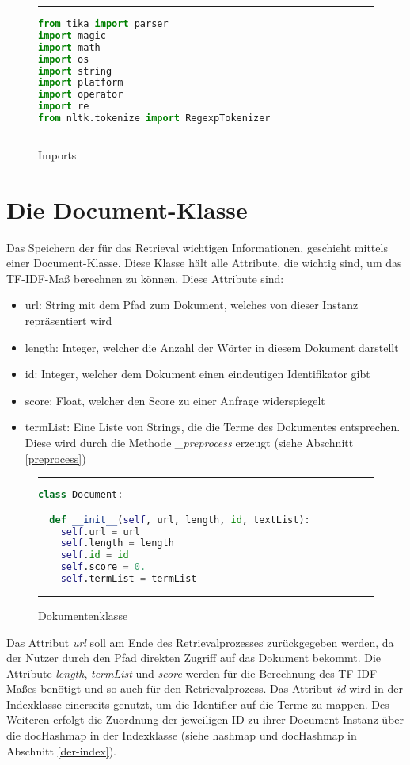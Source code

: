 \begin{figure}[h]
	\rule{\textwidth}{0.4pt}
		\begin{lstlisting}[language=Python]
from tika import parser
import magic
import math
import os
import string
import platform
import operator
import re
from nltk.tokenize import RegexpTokenizer
		\end{lstlisting}
	\rule{\textwidth}{0.4pt}
	\caption{Imports}
	\label{fig:import}
\end{figure}

\section{Die Document-Klasse}\label{die-document-klasse}

Das Speichern der für das Retrieval wichtigen Informationen, geschieht mittels einer Document-Klasse. Diese Klasse hält alle Attribute, die wichtig sind, um das TF-IDF-Maß berechnen zu können. Diese Attribute sind:
\begin{itemize}
	\item url: String mit dem Pfad zum Dokument, welches von dieser Instanz repräsentiert wird
	\item length: Integer, welcher die Anzahl der Wörter in diesem Dokument darstellt
	\item id: Integer, welcher dem Dokument einen eindeutigen Identifikator gibt
	\item score: Float, welcher den Score zu einer Anfrage widerspiegelt
	\item termList: Eine Liste von Strings, die die Terme des Dokumentes entsprechen. Diese wird durch die Methode \textit{\_preprocess} erzeugt (siehe Abschnitt \ref{preprocess})
\end{itemize} 

\begin{figure}[h]
	\rule{\textwidth}{0.4pt}
		\begin{lstlisting}[language=Python]
class Document:

  def __init__(self, url, length, id, textList):
    self.url = url
    self.length = length
    self.id = id
    self.score = 0.
    self.termList = termList
		\end{lstlisting}
	\rule{\textwidth}{0.4pt}
	\caption{Dokumentenklasse}
	\label{fig:document}
\end{figure}

Das Attribut \textit{url} soll am Ende des Retrievalprozesses zurückgegeben werden, da der Nutzer durch den Pfad direkten Zugriff auf das Dokument bekommt. Die Attribute \textit{length}, \textit{termList} und \textit{score} werden für die Berechnung des TF-IDF-Maßes benötigt und so auch für den Retrievalprozess. Das Attribut \textit{id} wird in der Indexklasse einerseits genutzt, um die Identifier auf die Terme zu mappen. Des Weiteren erfolgt die Zuordnung der jeweiligen ID zu ihrer Document-Instanz über die docHashmap in der Indexklasse (siehe hashmap und docHashmap in Abschnitt \ref{der-index}).

